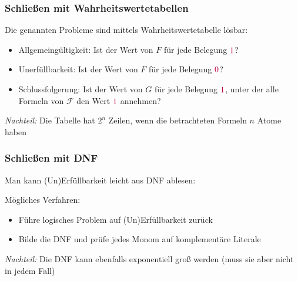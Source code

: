 \documentclass[aspectratio=1610,onlymath]{beamer}
\begin{document}
\begin{frame}\frametitle{Schließen mit Wahrheitswertetabellen}

Die genannten Probleme sind mittels Wahrheitswertetabelle lösbar:%
\begin{itemize}
\item \alert{Allgemeingültigkeit:} Ist der Wert von $F$ für jede Belegung $\textcolor{purple}{1}$?
\item \alert{Unerfüllbarkeit:} Ist der Wert von $F$ für jede Belegung $\textcolor{purple}{0}$?
\item \alert{Schlussfolgerung:} Ist der Wert von $G$ für jede Belegung $\textcolor{purple}{1}$, unter der alle Formeln von $\mathcal{F}$ den Wert $\textcolor{purple}{1}$ annehmen?
\end{itemize}\pause

\emph{Nachteil:} Die Tabelle hat $2^n$ Zeilen, wenn die betrachteten Formeln $n$ Atome haben
\bigskip


\end{frame}

\begin{frame}[t]\frametitle{Schließen mit DNF}

Man kann (Un)Erfüllbarkeit leicht aus DNF ablesen:\medskip


Mögliches Verfahren:
\begin{itemize}
\item Führe logisches Problem auf (Un)Erfüllbarkeit zurück
\item Bilde die DNF und prüfe jedes Monom auf komplementäre Literale
\end{itemize}
\emph{Nachteil:} Die DNF kann ebenfalls exponentiell groß werden (muss sie aber nicht in jedem Fall)

\end{frame}
\end{document}
